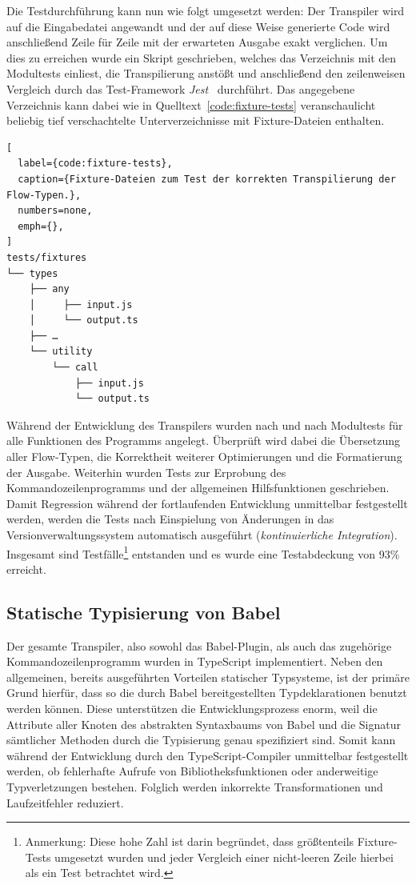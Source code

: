 Die Testdurchführung kann nun wie folgt umgesetzt werden: Der Transpiler wird auf die Eingabedatei angewandt und der auf diese Weise generierte Code wird anschließend Zeile für Zeile mit der erwarteten Ausgabe exakt verglichen. Um dies zu erreichen wurde ein Skript geschrieben, welches das Verzeichnis mit den Modultests einliest, die Transpilierung anstößt und anschließend den zeilenweisen Vergleich durch das Test-Framework \textit{Jest}~\autocite{SOFTWARE:JEST} durchführt. Das angegebene Verzeichnis kann dabei wie in Quelltext~\ref{code:fixture-tests} veranschaulicht beliebig tief verschachtelte Unterverzeichnisse mit Fixture-Dateien enthalten.

\begin{lstlisting}[
  label={code:fixture-tests},
  caption={Fixture-Dateien zum Test der korrekten Transpilierung der Flow-Typen.},
  numbers=none,
  emph={},
]
tests/fixtures
└── types
    ├── any
    │     ├── input.js
    │     └── output.ts
    ├── …
    └── utility
        └── call
            ├── input.js
            └── output.ts
\end{lstlisting}

Während der Entwicklung des Transpilers wurden nach und nach Modultests für alle Funktionen des Programms angelegt. Überprüft wird dabei die Übersetzung aller Flow-Typen, die Korrektheit weiterer Optimierungen und die Formatierung der Ausgabe. Weiterhin wurden Tests zur Erprobung des Kommandozeilenprogramms und der allgemeinen Hilfsfunktionen geschrieben. Damit Regression während der fortlaufenden Entwicklung unmittelbar festgestellt werden, werden die Tests nach Einspielung von Änderungen in das Versionverwaltungssystem automatisch ausgeführt (\textit{kontinuierliche Integration}). Insgesamt sind \numberOfTests Testfälle\footnote{Anmerkung: Diese hohe Zahl ist darin begründet, dass größtenteils Fixture-Tests umgesetzt wurden und jeder Vergleich einer nicht-leeren Zeile hierbei als ein Test betrachtet wird.} entstanden und es wurde eine Testabdeckung von 93\% erreicht.

\subsection{Statische Typisierung von Babel}

Der gesamte Transpiler, also sowohl das Babel-Plugin, als auch das zugehörige Kommandozeilenprogramm wurden in TypeScript implementiert. Neben den allgemeinen, bereits ausgeführten Vorteilen statischer Typsysteme, ist der primäre Grund hierfür, dass so die durch Babel bereitgestellten Typdeklarationen benutzt werden können. Diese unterstützen die Entwicklungsprozess enorm, weil die Attribute aller Knoten des abstrakten Syntaxbaums von Babel und die Signatur sämtlicher Methoden durch die Typisierung genau spezifiziert sind. Somit kann während der Entwicklung durch den TypeScript-Compiler unmittelbar festgestellt werden, ob fehlerhafte Aufrufe von Bibliotheksfunktionen oder anderweitige Typverletzungen bestehen. Folglich werden inkorrekte Transformationen und Laufzeitfehler reduziert.

